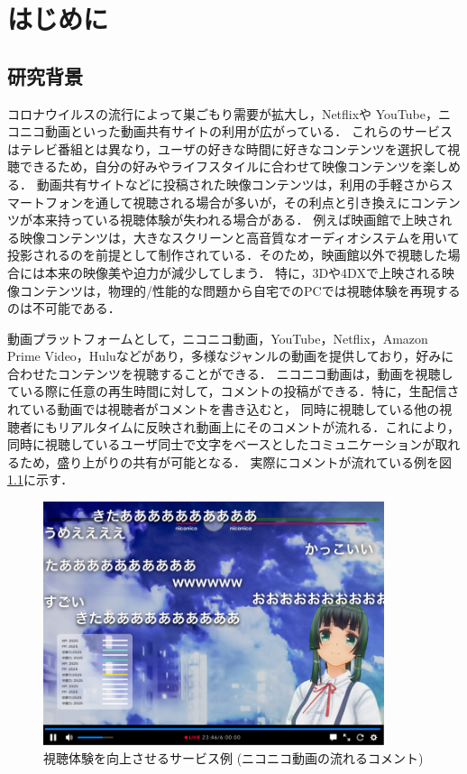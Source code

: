 \chapter{はじめに}
\thispagestyle{myheadings}

\section{研究背景}
コロナウイルスの流行によって巣ごもり需要が拡大し，Netflixや YouTube，ニコニコ動画といった動画共有サイトの利用が広がっている．
これらのサービスはテレビ番組とは異なり，ユーザの好きな時間に好きなコンテンツを選択して視聴できるため，自分の好みやライフスタイルに合わせて映像コンテンツを楽しめる．
動画共有サイトなどに投稿された映像コンテンツは，利用の手軽さからスマートフォンを通して視聴される場合が多いが，その利点と引き換えにコンテンツが本来持っている視聴体験が失われる場合がある．
例えば映画館で上映される映像コンテンツは，大きなスクリーンと高音質なオーディオシステムを用いて投影されるのを前提として制作されている．そのため，映画館以外で視聴した場合には本来の映像美や迫力が減少してしまう．
特に，3Dや4DXで上映される映像コンテンツは，物理的/性能的な問題から自宅でのPCでは視聴体験を再現するのは不可能である．

動画プラットフォームとして，ニコニコ動画，YouTube，Netflix，Amazon Prime Video，Huluなどがあり，多様なジャンルの動画を提供しており，好みに合わせたコンテンツを視聴することができる．
ニコニコ動画は，動画を視聴している際に任意の再生時間に対して，コメントの投稿ができる．特に，生配信されている動画では視聴者がコメントを書き込むと，
同時に視聴している他の視聴者にもリアルタイムに反映され動画上にそのコメントが流れる．これにより，同時に視聴しているユーザ同士で文字をベースとしたコミュニケーションが取れるため，盛り上がりの共有が可能となる．
実際にコメントが流れている例を図\ref{nikoniko}に示す．

\begin{figure}[H]
    \centering
    \includegraphics[width=10cm]{images/chapter1/nikoniko_grafu.png}
    \caption{視聴体験を向上させるサービス例 (ニコニコ動画の流れるコメント)}
    \label{nikoniko}
\end{figure}

